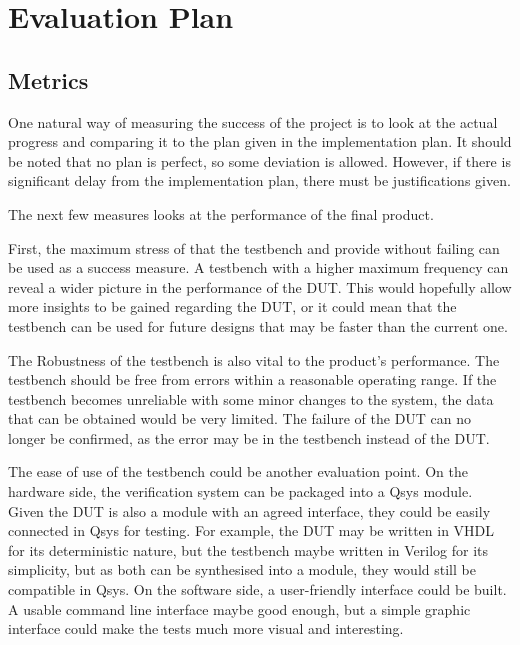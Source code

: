 \section{Evaluation Plan}

\subsection{Metrics}
One natural way of measuring the success of the project is to look at the actual
progress and comparing it to the plan given in the implementation plan.
It should be noted that no plan is perfect, so some deviation is allowed.
However, if there is significant delay from the implementation plan, there must
be justifications given.

The next few measures looks at the performance of the final product.

First, the maximum stress of that the testbench and provide without failing can
be used as a success measure.
A testbench with a higher maximum frequency can reveal a wider picture in the
performance of the DUT.
This would hopefully allow more insights to be gained regarding the DUT, or
it could mean that the testbench can be used for future designs that may be
faster than the current one.

The Robustness of the testbench is also vital to the product's performance.
The testbench should be free from errors within a reasonable operating range.
If the testbench becomes unreliable with some minor changes to the system,
the data that can be obtained would be very limited.
The failure of the DUT can no longer be confirmed, as the error may be in the
testbench instead of the DUT.

The ease of use of the testbench could be another evaluation point.
On the hardware side, the verification system can be packaged into a Qsys
module.
Given the DUT is also a module with an agreed interface, they could be easily
connected in Qsys for testing.
For example, the DUT may be written in VHDL for its deterministic nature, but
the testbench maybe written in Verilog for its simplicity, but as both can be
synthesised into a module, they would still be compatible in Qsys.
On the software side, a user-friendly interface could be built.
A usable command line interface maybe good enough, but a simple graphic
interface could make the tests much more visual and interesting.

